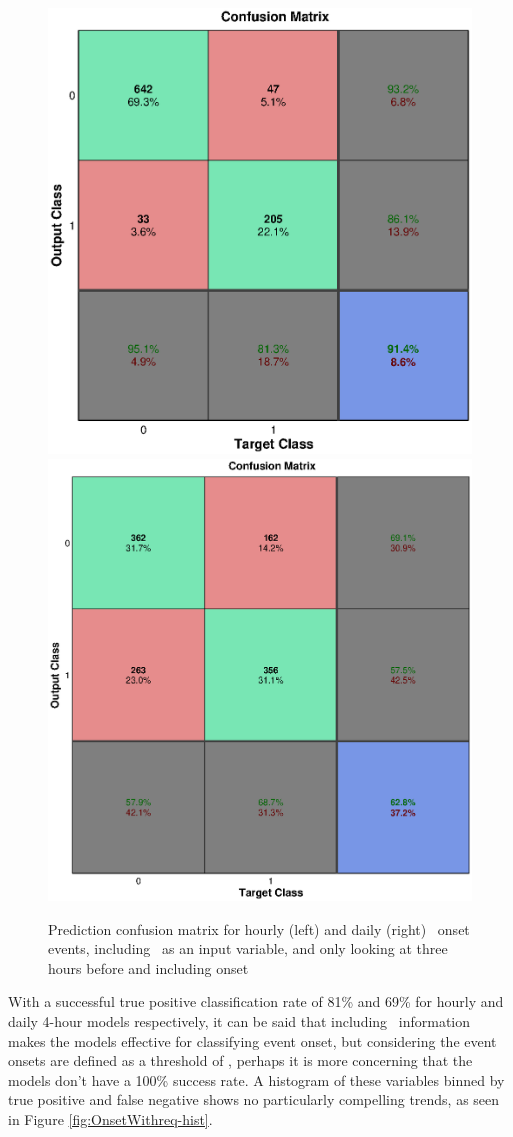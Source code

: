 \begin{figure}[htp!]
	\centering
	\includegraphics[width=0.45\linewidth]{Figures/CH5/NNBinaryOnset-hourly-withreq.eps}
	\includegraphics[width=0.45\linewidth]{Figures/CH5/NNBinaryOnset-daily-withreq.eps}
	\caption{Prediction confusion matrix for hourly (left) and daily (right) \req\ onset events, including \req\ as an input variable, and only looking at three hours before and including onset}
	\label{fig:OnsetWithreq}
\end{figure}

With a successful true positive classification rate of 81\% and 69\% for hourly and daily 4-hour models respectively, it can be said that including \req\ information makes the models effective for classifying event onset, but considering the event onsets are defined as a threshold of \req, perhaps it is more concerning that the models don't have a 100\% success rate. A histogram of these variables binned by true positive and false negative shows no particularly compelling trends, as seen in Figure \ref{fig:OnsetWithreq-hist}.


